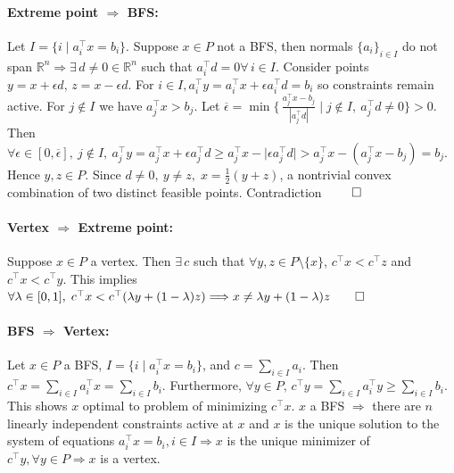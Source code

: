 \documentclass{article}
\newcommand{\abs}[1]{\lvert#1\rvert}
\begin{document}
\paragraph{Extreme point $\Rightarrow$ BFS:} Let $I=\{i \mid a_i^\top x = b_i\}$. Suppose $x\in P$ not a BFS, then normals $\{a_i\}_{i\in I}$ do not span $\mathbb R^n \Longrightarrow \exists\, d \neq 0 \in\mathbb R^n$ such that $a_i^\top d = 0 \forall\,i \in I$. 
Consider points $y = x + \epsilon d,\, z=x - \epsilon d$. For $i\in I, a_i^\top y = a_i^\top x + \epsilon a_i^\top d = b_i$ so constraints remain active. For $j\notin I$ we have $a_j^\top x > b_j$. 
Let $\overline \epsilon =  \min\Big\{\,\tfrac{a_j^\top  x-b_j}{\,|a_j^\top  d|\,}\mid j\notin I,\ a_j^\top  d\neq 0\Big\} > 0$.
Then $\forall \epsilon \in [0, \overline \epsilon],\ j \notin I,\ a_j^\top y = a_j^\top x + \epsilon a_j^\top d \geq a_j^\top x - \abs{\epsilon a_j^\top d} > a_j^\top x - (a_j^\top x - b_j) = b_j$. Hence $y,z\in P$. 
Since $d \neq 0,\ y\neq z,\; x = \frac{1}{2}(y + z)$, a nontrivial convex combination of two distinct feasible points. Contradiction $\qed$ 

\paragraph{Vertex $\Rightarrow$ Extreme point:} Suppose $x\in P$ a vertex. Then $\exists\,c$ such that $\forall y,z\in P\setminus\{x\}$, $c^\top x < c^\top z$ and $c^\top x < c^\top y$. This implies $\forall \lambda\in[0,1],\; c^\top x < c^\top (\lambda y + (1 - \lambda)z) \Longrightarrow x \neq  \lambda y + (1 - \lambda)z \qed$

\paragraph{BFS $\Rightarrow$ Vertex:} Let $x\in P$ a BFS, $I=\{i \mid a_i^\top x = b_i\}$, and $c = \sum_{i\in I}a_i$. Then $c^\top x = \sum_{i\in I}a_i^\top x = \sum_{i\in I}b_i$. Furthermore, $\forall y \in P,\, c^\top y = \sum_{i\in I}a_i^\top y \geq \sum_{i\in I}b_i$. This shows $x$ optimal to problem of minimizing $c^\top x$. $x$ a BFS $\Longrightarrow$ there are $n$ linearly independent constraints active at $x$ and $x$ is the unique solution to the system of equations $a_i^\top x = b_i, i\in I \Longrightarrow x$ is the unique minimizer of $c^\top y, \forall y\in P \Longrightarrow x$ is a vertex.
\end{document}
